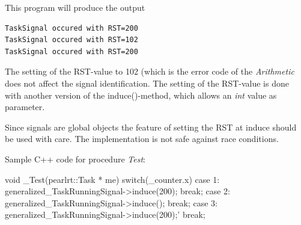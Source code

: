 This program will produce the output
\begin{verbatim}
TaskSignal occured with RST=200
TaskSignal occured with RST=102
TaskSignal occured with RST=200
\end{verbatim}
The setting of the RST-value to 102 (which is the error code of 
the {\em Arithmetic} does not affect the signal identification.
The setting of the RST-value is done with another version of the 
induce()-method, which allows an {\em int} value as parameter.

Since signals are global objects the feature of setting the RST at
induce should be used with care. The implementation is not safe against
race conditions.

Sample C++ code for procedure {\em Test}:
\begin{CppCode}
void _Test(pearlrt::Task * me) {
   switch(_counter.x) {
      case 1: 
       generalized_TaskRunningSignal->induce(200);
       break;
      case 2: 
       generalized_TaskRunningSignal->induce();
       break;
      case 3: 
       generalized_TaskRunningSignal->induce(200);'
       break;
    }
}
\end{CppCode}

